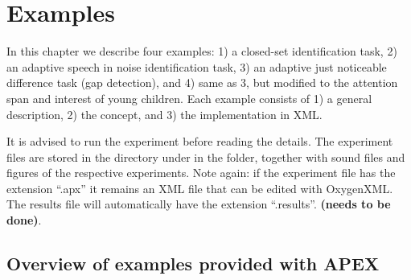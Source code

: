 
\chapter{Examples}
\label{chap:Examples}

In this chapter we describe four examples: 1) a closed-set
identification task, 2) an adaptive speech in noise identification
task, 3) an adaptive just noticeable difference task (gap
detection), and 4) same as 3, but modified to the attention span
and interest of young children. Each example consists of 1) a
general description, 2) the concept, and 3) the implementation in
XML.

It is advised to run the experiment before reading the details.
The experiment files are stored in the \apex directory under
 in the \apex folder, together with
sound files and figures of the respective experiments. Note again:
if the experiment file has the extension ``.apx'' it remains an
XML file that can be edited with OxygenXML. The results file will
automatically have the extension ``.results''. \textbf{(needs to
be done)}.


\section{Overview of examples provided with APEX} 







